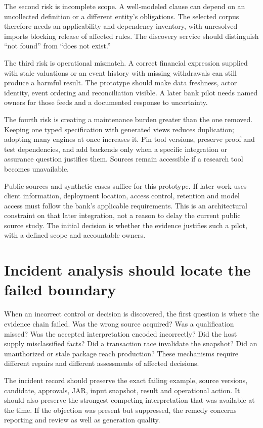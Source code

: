 \documentclass[12pt,a4paper,oneside,openany]{book}
\begin{document}
The second risk is incomplete scope. A well-modeled clause can depend on an
uncollected definition or a different entity's obligations. The selected corpus
therefore needs an applicability and dependency inventory, with unresolved imports
blocking release of affected rules. The discovery service should distinguish
``not found'' from ``does not exist.''

The third risk is operational mismatch. A correct financial expression supplied
with stale valuations or an event history with missing withdrawals can still
produce a harmful result. The prototype should make data freshness, actor
identity, event ordering and reconciliation visible. A later bank pilot needs
named owners for those feeds and a documented response to uncertainty.

The fourth risk is creating a maintenance burden greater than the one removed.
Keeping one typed specification with generated views reduces duplication;
adopting many engines at once increases it. Pin tool versions, preserve proof and
test dependencies, and add backends only when a specific integration or assurance
question justifies them. Sources remain accessible if a research tool becomes
unavailable.

Public sources and synthetic cases suffice for this prototype. If later work
uses client information, deployment location, access control, retention and model
access must follow the bank's applicable requirements. This is an architectural
constraint on that later integration, not a reason to delay the current public
source study. The initial decision is whether the evidence justifies such a pilot,
with a defined scope and accountable owners.

\section{Incident analysis should locate the failed boundary}
\label{merge:M10:08}


When an incorrect control or decision is discovered, the first question is where
the evidence chain failed. Was the wrong source acquired? Was a qualification
missed? Was the accepted interpretation encoded incorrectly? Did the host supply
misclassified facts? Did a transaction race invalidate the snapshot? Did an
unauthorized or stale package reach production? These mechanisms require different
repairs and different assessments of affected decisions.

The incident record should preserve the exact failing example, source versions,
candidate, approvals, JAR, input snapshot, result and operational action. It
should also preserve the strongest competing interpretation that was available
at the time. If the objection was present but suppressed, the remedy concerns
reporting and review as well as generation quality.
\end{document}
